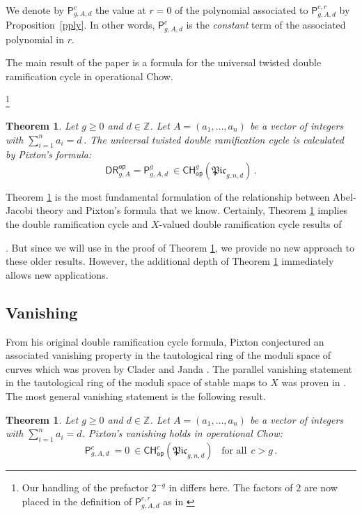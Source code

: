 \documentclass[a4paper,12pt]{article} %
\def\P{\mathsf{P}}
\theoremstyle{definition}
\theoremstyle{plain}%
\newtheorem{theorem}[definition]{Theorem}
\newcommand{\Picabs}{\mathfrak{Pic}}
\begin{document}
We denote by $\P_{g,A,d}^c$ the value at $r=0$ 
of the polynomial associated to $\P_{g,A,d}^{c,r}$ by Proposition~\ref{pply}. In other words, $\P_{g,A,d}^c$ is the {\em constant} term of the associated polynomial in $r$. 

The main result of the paper is a 
 formula for the universal twisted double ramification cycle in operational Chow.{\footnote{Our
handling of the prefactor $2^{-g}$ in \cite[Theorem 1]{Janda2016Double-ramifica} differs here.
The factors of $2$ are now placed in the definition of $\P_{g,A,d}^{c,r}$
as in \cite{Janda2018Double-ramifica}}


\begin{theorem} \label{Thm:main}
Let $g\geq 0$ and $d\in \mathbb{Z}$.
Let $A=(a_1,\ldots,a_n)$ be a vector of integers with
$\sum_{i=1}^n a_i=d\,$.
The universal twisted double ramification cycle is calculated by Pixton's formula:
$$\mathsf{DR}^{\mathsf{op}}_{g,A} =\P_{g,A,d}^g\
\in {\mathsf{CH}}^g_{\mathsf{op}}(\Picabs_{g,n,d})\, .$$
\end{theorem}



Theorem \ref{Thm:main} is the most fundamental formulation of the relationship
between Abel-Jacobi theory and Pixton's formula that we know. Certainly,  
Theorem \ref{Thm:main} 
implies the double ramification cycle and $X$-valued
double ramification cycle results of \cite{Janda2016Double-ramifica,Janda2018Double-ramifica} }. But since we will
use \cite{Janda2018Double-ramifica} in the proof of Theorem \ref{Thm:main}, we provide no new approach to
these older results. However, the additional depth of Theorem \ref{Thm:main} immediately
allows new applications.


\subsection{Vanishing}
From his original double
ramification cycle formula,
Pixton conjectured an associated
vanishing property in the
tautological ring of the moduli
space of curves which
was proven by Clader and Janda \cite{cj}.
The parallel vanishing statement
in the tautological ring of the
moduli space of stable maps to $X$
was proven in \cite{Bae}.
The most general vanishing
statement is the following
result.


\begin{theorem} \label{Thm:mainvan}
Let $g\geq 0$ and $d\in \mathbb{Z}$.
Let $A=(a_1,\ldots,a_n)$ be a vector of integers with
$\sum_{i=1}^n a_i=d$.
 Pixton's vanishing holds
 in operational Chow:
$$ \P_{g,A,d}^c\ = 0 \
\in {\mathsf{CH}}^c_{\mathsf{op}}(\Picabs_{g,n,d})\, \ \ \ 
{\text{for all}} \ \ c>g\, .
$$ 
\end{theorem}
\end{document}
